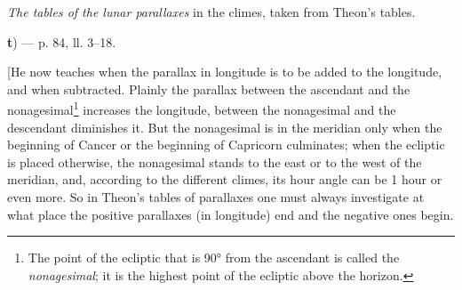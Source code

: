 \documentclass[11pt]{article}
\newcommand{\Pg}[1]{\marginpar{\footnotesize\color{gray}#1}}
\begin{document}
\par \emph{The tables of the lunar parallaxes} in the climes, taken from Theon's tables.\par
\par [Theon computed the tables taking the obliquity of the ecliptic as 23° 51′, that is, 16′ greater than al-Battānī's obliquity. From this a small difference must arise in the computation of the parallax; it reaches its greatest amount in the parallax in latitude when the moon, being in Cancer and at its northern limit, culminates in the meridian. The moon is then only 7 1/2° from the zenith of the city of al-Raqqa; the parallax (with a horizontal parallax of 60 minutes) comprises about 7 1/2′; a change of 16′ in the zenith distance then produces a change of about 16″ in the parallax, which was a negligible quantity at that time.\par
\par Al-Battānī rightly warns, however, that those tables, though more convenient than direct computation, produce some small errors. This is due to various causes. The first is the different obliquity that Theon used. The second is the interpolations, to be made over the large interval of 15 degrees of hour angle and of half an hour in the clime of the given city; such interpolations may not be used in an accurate computation. The third, lastly, is that these tables hold only when the latitude of the moon is small (as always happens in eclipses of the sun). — Schiaparelli.]\par
\par\begin{center}\textbf{t}) — p. 84, ll. 3–18.\end{center}
\par \Pg{I 263}[He now teaches when the parallax in longitude is to be added to the longitude, and when subtracted. Plainly the parallax between the ascendant and the nonagesimal\footnote{The point of the ecliptic that is 90° from the ascendant is called the \emph{nonagesimal}; it is the highest point of the ecliptic above the horizon.} increases the longitude, between the nonagesimal and the descendant diminishes it. But the nonagesimal is in the meridian only when the beginning of Cancer or the beginning of Capricorn culminates; when the ecliptic is placed otherwise, the nonagesimal stands to the east or to the west of the meridian, and, according to the different climes, its hour angle can be 1 hour or even more. So in Theon's tables of parallaxes one must always investigate at what place the positive parallaxes (in longitude) end and the negative ones begin.\par
\end{document}
